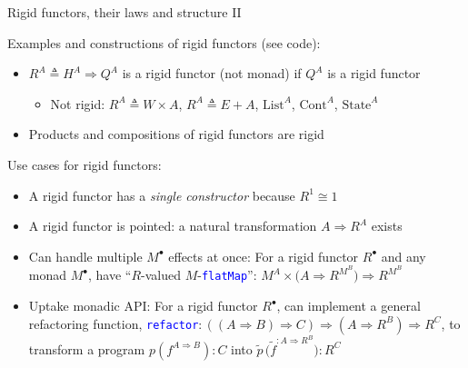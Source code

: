 \documentclass[english]{beamer}
\begin{document}
\begin{frame}{Rigid functors, their laws and structure II}

Examples and constructions of rigid functors (see code):
\begin{itemize}
\item $R^{A}\triangleq H^{A}\Rightarrow Q^{A}$ is a rigid functor (not
monad) if $Q^{A}$ is a rigid functor
\begin{itemize}
\item Not rigid: $R^{A}\triangleq W\times A$, $R^{A}\triangleq E+A$, $\text{List}^{A}$,
$\text{Cont}^{A}$, $\text{State}^{A}$
\end{itemize}
\item Products and compositions of rigid functors are rigid
\end{itemize}
Use cases for rigid functors:
\begin{itemize}
\item A rigid functor has a \emph{single constructor} because $R^{1}\cong1$
\item A rigid functor is pointed: a natural transformation $A\Rightarrow R^{A}$
exists
\item Can handle multiple $M^{\bullet}$ effects at once: For a rigid functor
$R^{\bullet}$ and any monad $M^{\bullet}$, have ``$R$-valued $M$-\texttt{\textcolor{blue}{\footnotesize{}flatMap}}'':
$M^{A}\times\big(A\Rightarrow R^{M^{B}}\big)\Rightarrow R^{M^{B}}$
\item Uptake monadic API: For a rigid functor $R^{\bullet}$, can implement
a general refactoring function, \texttt{\textcolor{blue}{\footnotesize{}refactor}}$:\left(\left(A\Rightarrow B\right)\Rightarrow C\right)\Rightarrow\left(A\Rightarrow R^{B}\right)\Rightarrow R^{C}$,
to transform a program $p\left(f^{A\Rightarrow B}\right):C$ into
$\tilde{p}\,\big(\tilde{f}^{:A\Rightarrow R^{B}}\big):R^{C}$
\end{itemize}
\end{frame}
\end{document}
